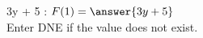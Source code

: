 \documentclass{ximera}
\begin{document}
\begin{exercise}

3y + 5 :  $F(1) = \answer{3y + 5}$ \\
Enter DNE if the value does not exist.

\end{exercise}
\end{document}
